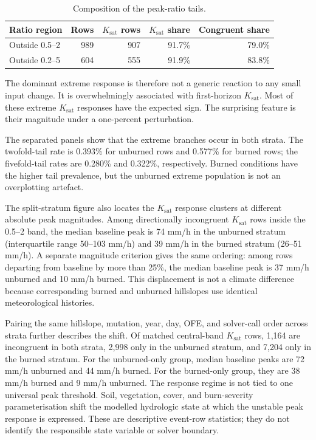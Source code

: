 \documentclass[11pt]{article}
\newcommand{\Ksat}{\ensuremath{K_{\mathrm{sat}}}}
\begin{document}
\begin{table}[H]
  \centering
  \caption{Composition of the peak-ratio tails.}
  \label{tab:tails}
  \begin{tabular}{lrrrr}
    \toprule
    Ratio region & Rows & \Ksat{} rows & \Ksat{} share & Congruent share \\
    \midrule
    Outside 0.5--2 & 989 & 907 & 91.7\% & 79.0\% \\
    Outside 0.2--5 & 604 & 555 & 91.9\% & 83.8\% \\
    \bottomrule
  \end{tabular}
\end{table}

The dominant extreme response is therefore not a generic reaction to any small
input change. It is overwhelmingly associated with first-horizon \Ksat{}.
Most of these extreme \Ksat{} responses have the expected sign. The surprising
feature is their magnitude under a one-percent perturbation.

The separated panels show that the extreme branches occur in both strata. The
twofold-tail rate is 0.393\% for unburned rows and 0.577\% for burned rows;
the fivefold-tail rates are 0.280\% and 0.322\%, respectively. Burned conditions
have the higher tail prevalence, but the unburned extreme population is not an
overplotting artefact.

The split-stratum figure also locates the \Ksat{} response clusters at
different absolute peak magnitudes. Among directionally incongruent \Ksat{}
rows inside the 0.5--2 band, the median baseline peak is 74 mm/h in the
unburned stratum (interquartile range 50--103 mm/h) and 39 mm/h in the burned
stratum (26--51 mm/h). A separate magnitude criterion gives the same ordering:
among rows departing from baseline by more than 25\%, the median baseline peak
is 37 mm/h unburned and 10 mm/h burned. This displacement is not a climate
difference because corresponding burned and unburned hillslopes use identical
meteorological histories.

Pairing the same hillslope, mutation, year, day, OFE, and solver-call order
across strata further describes the shift. Of matched central-band \Ksat{}
rows, 1,164 are incongruent in both strata, 2,998 only in the unburned stratum,
and 7,204 only in the burned stratum. For the unburned-only group, median
baseline peaks are 72 mm/h unburned and 44 mm/h burned. For the burned-only
group, they are 38 mm/h burned and 9 mm/h unburned. The response regime is not
tied to one universal peak threshold. Soil, vegetation, cover, and
burn-severity parameterisation shift the modelled hydrologic state at which the
unstable peak response is expressed. These are descriptive event-row
statistics; they do not identify the responsible state variable or solver
boundary.
\end{document}
